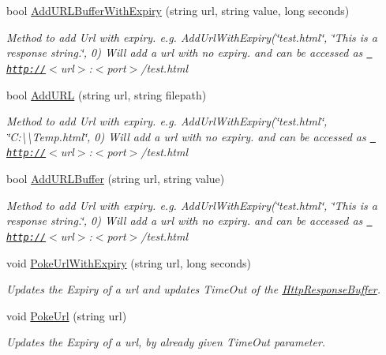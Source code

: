 \begin{DoxyCompactItemize}
bool \mbox{\hyperlink{class_concord_1_1_c3_http_module_1_1_web_server_a9f17565ccae30225d831e01f14ce7b35}{Add\+U\+R\+L\+Buffer\+With\+Expiry}} (string url, string value, long seconds)
\begin{DoxyCompactList}\small\item\em Method to add Url with expiry. e.\+g. Add\+Url\+With\+Expiry(\char`\"{}test.\+html\char`\"{}, \char`\"{}\+This is a response string.\char`\"{}, 0) Will add a url with no expiry. and can be accessed as \href{http://}{\texttt{ http\+://}}$<$url$>$\+:$<$port$>$/test.html \end{DoxyCompactList}\item 
bool \mbox{\hyperlink{class_concord_1_1_c3_http_module_1_1_web_server_ad44fcb4fc6cac61ba3af5bbe28d79132}{Add\+U\+RL}} (string url, string filepath)
\begin{DoxyCompactList}\small\item\em Method to add Url with expiry. e.\+g. Add\+Url\+With\+Expiry(\char`\"{}test.\+html\char`\"{}, \char`\"{}\+C\+:\textbackslash{}\textbackslash{}\+Temp.\+html\char`\"{}, 0) Will add a url with no expiry. and can be accessed as \href{http://}{\texttt{ http\+://}}$<$url$>$\+:$<$port$>$/test.html \end{DoxyCompactList}\item 
bool \mbox{\hyperlink{class_concord_1_1_c3_http_module_1_1_web_server_a911477bcbed2ac2482ab9dafbdd33994}{Add\+U\+R\+L\+Buffer}} (string url, string value)
\begin{DoxyCompactList}\small\item\em Method to add Url with expiry. e.\+g. Add\+Url\+With\+Expiry(\char`\"{}test.\+html\char`\"{}, \char`\"{}\+This is a response string.\char`\"{}, 0) Will add a url with no expiry. and can be accessed as \href{http://}{\texttt{ http\+://}}$<$url$>$\+:$<$port$>$/test.html \end{DoxyCompactList}\item 
void \mbox{\hyperlink{class_concord_1_1_c3_http_module_1_1_web_server_ad3121bff4e1aeaeb05a5f1636d1e7d65}{Poke\+Url\+With\+Expiry}} (string url, long seconds)
\begin{DoxyCompactList}\small\item\em Updates the Expiry of a url and updates Time\+Out of the \mbox{\hyperlink{class_concord_1_1_c3_http_module_1_1_http_response_buffer}{Http\+Response\+Buffer}}. \end{DoxyCompactList}\item 
void \mbox{\hyperlink{class_concord_1_1_c3_http_module_1_1_web_server_ad58516396d74972ad8f1005c889e1379}{Poke\+Url}} (string url)
\begin{DoxyCompactList}\small\item\em Updates the Expiry of a url, by already given Time\+Out parameter. \end{DoxyCompactList}\end{DoxyCompactItemize}
